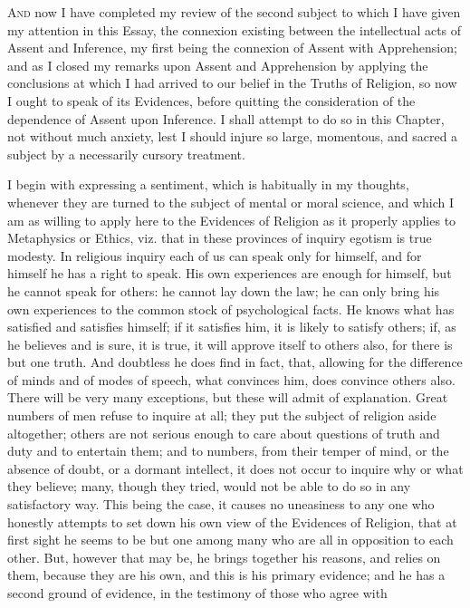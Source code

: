A\textsc{nd} now I have completed my review of the second subject to
which I have given my attention in this Essay, the connexion existing
between the intellectual acts of Assent and Inference, my first being
the connexion of Assent with Apprehension; and as I closed my remarks
upon Assent and Apprehension by applying the conclusions at which I
had arrived to our belief in the Truths of Religion, so now I ought to
speak of its Evidences, before quitting the consideration of the
dependence of Assent upon Inference. I shall attempt to do so in this
Chapter, not without much anxiety, lest I should injure so large,
momentous, and sacred a subject by a necessarily cursory treatment.

I begin with expressing a sentiment, which is habitually in my
thoughts, whenever they are turned to the subject of mental or moral
science, and which I am as willing to apply here to the Evidences of
Religion as it properly applies to Metaphysics or Ethics, viz. that in
these provinces of inquiry egotism is true modesty. In religious
inquiry each of us can speak only for himself, and for himself he has
a right to speak. His own experiences are enough for himself, but he
cannot speak for others: he cannot lay down the law; he can only bring
his own experiences to the common stock of psychological facts. He
knows what has satisfied and satisfies himself; if it satisfies him,
it is likely to satisfy others; if, as he believes and is sure, it is
true, it will approve itself to others also, for there is but one
truth. And doubtless he does find in fact, that, allowing for the
difference of minds and of modes of speech, what convinces him, does
convince others also. There will be very many exceptions, but these
will admit of explanation. Great numbers of men refuse to inquire at
all; they put the subject of religion aside altogether; others are not
serious enough to care about questions of truth and duty and to
entertain them; and to numbers, from their temper of mind, or the
absence of doubt, or a dormant intellect, it does not occur to inquire
why or what they believe; many, though they tried, would not be able
to do so in any satisfactory way. This being the case, it causes no
uneasiness to any one who honestly attempts to set down his own view
of the Evidences of Religion, that at first sight he seems to be but
one among many who are all in opposition to each other. But, however
that may be, he brings together his reasons, and relies on them,
because they are his own, and this is his primary evidence; and he has
a second ground of evidence, in the testimony of those who agree with

